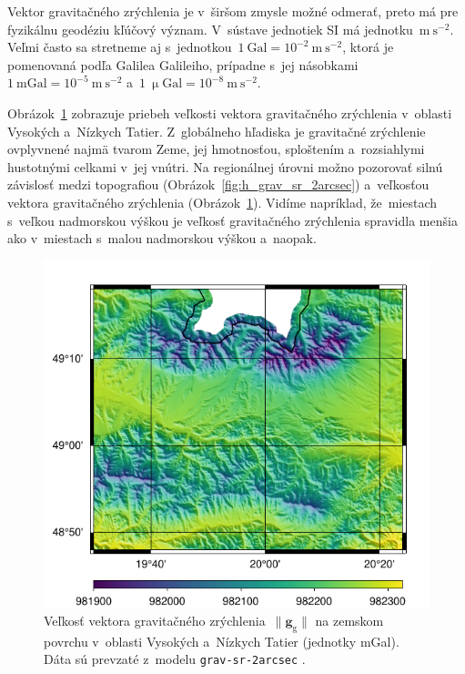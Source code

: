 \documentclass[a4paper, 12pt]{book}
\newcommand{\gidx}{\mathrm g}
\let\vec\mathbf
\begin{document}
Vektor gravitačného zrýchlenia je v~širšom zmysle možné odmerať, preto má pre 
fyzikálnu geodéziu kľúčový význam.  V~sústave jednotiek SI má 
jednotku~$\mathrm{m}\ \mathrm{s}^{-2}$.  Veľmi často sa stretneme aj 
s~jednotkou~$1\ \mathrm{Gal} = 10^{-2}\ \mathrm{m}\ \mathrm{s}^{-2}$, ktorá je 
pomenovaná podľa Galilea Galileiho, prípadne s~jej násobkami~$1\ \mathrm{mGal} 
= 10^{-5}\ \mathrm{m}\ \mathrm{s}^{-2}$ a~$1\ \upmu \mathrm{Gal} = 10^{-8}\ 
\mathrm{m}\ \mathrm{s}^{-2}$.

Obrázok~\ref{fig:gg_grav_sr_2arcsec} zobrazuje priebeh veľkosti vektora 
gravitačného zrýchlenia v~oblasti Vysokých a~Nízkych Tatier.  Z~globálneho 
hľadiska je gravitačné zrýchlenie ovplyvnené najmä tvarom Zeme, jej hmotnosťou, 
sploštením a~rozsiahlymi hustotnými celkami v~jej vnútri.  Na regionálnej 
úrovni možno pozorovať silnú závislosť medzi topografiou 
(Obrázok~\ref{fig:h_grav_sr_2arcsec}) a~veľkosťou vektora gravitačného 
zrýchlenia (Obrázok~\ref{fig:gg_grav_sr_2arcsec}).  Vidíme napríklad, 
že~miestach s~veľkou nadmorskou výškou je veľkosť gravitačného zrýchlenia 
spravidla menšia ako v~miestach s~malou nadmorskou výškou a~naopak.

\begin{figure}
\centering
\includegraphics{./fig-gg-grav-sr-2arcsec.pdf}
\caption{Veľkosť vektora gravitačného zrýchlenia~$\| \vec g_\gidx \|$ na 
zemskom povrchu v~oblasti Vysokých a~Nízkych Tatier (jednotky mGal).  Dáta sú 
prevzaté z~modelu \texttt{grav-sr-2arcsec} \parencite{GravSR2arcsec}.}
\label{fig:gg_grav_sr_2arcsec}
\end{figure}
\end{document}
